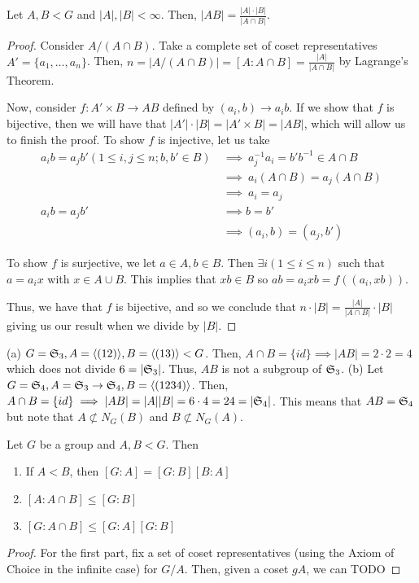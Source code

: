 \documentclass[11pt,leqno,oneside]{amsart}
\newcommand{\subgroup}{\mathrel{<}}
\begin{document}
    \begin{lem}
        Let $A,B \subgroup G$ and $|A|, |B| < \infty$. Then, $|AB| = \frac{|A| \cdot |B|}{|A \cap B|}$.
    \end{lem}
    \begin{proof}
        Consider $A/(A \cap B)$. Take a complete set of coset representatives $A' = \{a_1, \ldots, a_n\}$. Then, $n = |A/(A \cap B)| = [A : A \cap B] = \frac{|A|}{|A \cap B|}$ by Lagrange's Theorem.

        Now, consider $f: A' \times B \to AB$ defined by $(a_i,b) \to a_ib$. If
        we show that $f$ is bijective, then we will have that $|A'| \cdot |B| =
        |A' \times B| = |AB|$, which will allow us to finish the proof.
        To show $f$ is injective, let us take \begin{align*}
            a_ib = a_jb' (1 \leq i,j \leq n; b,b' \in B) & \ \implies \ a_j^{-1} a_i = b'b^{-1} \in A\cap B\\
            \ & \ \implies \ a_i(A \cap B) = a_j(A \cap B) \\
            \ & \ \implies \ a_i = a_j \\
            a_ib = a_jb' & \ \implies b = b' \\
            \ & \ \implies (a_i, b) = (a_j, b')
        \end{align*}

        To show $f$ is surjective, we let $a \in A, b \in B$. Then $\exists i
        (1 \leq i \leq n)$ such that $a=a_ix$ with $x \in A \cup B$. This
        implies that $xb \in B$ so $ab = a_ixb = f( (a_i,xb) )$.

        Thus, we have that $f$ is bijective, and so we conclude that $n \cdot
        |B| = \frac{|A|}{|A \cap B|} \cdot |B|$ giving us our result when we
        divide by $|B|$.
    \end{proof}
    \begin{example}
        (a) $G = \Sym_3, A = \langle (12) \rangle, B = \langle (13) \rangle
        \subgroup G$. Then, $A \cap B = \{ id \} \implies |AB| = 2 \cdot 2 = 4$
        which does not divide $6 = |\mathfrak{S}_3|$. Thus, $AB$ is not a subgroup of
        $\mathfrak{S}_3$.
        (b) Let $G=\mathfrak{S}_4, A = \mathfrak{S}_3 \to \mathfrak{S}_4, B = \langle (1234) \rangle$. Then, $A \cap B = \{id\} \implies |AB| = |A||B| = 6 \cdot 4 = 24 = |\mathfrak{S}_4|$. This means that $AB = \mathfrak{S}_4$ but note that $A \not\subset N_G(B)$ and $B \not\subset N_G(A)$.
    \end{example}
    \begin{lem}
        Let $G$ be a group and $A,B \subgroup G$. Then
        \begin{enumerate}
            \item If $A \subgroup B$, then $[G:A] = [G:B][B:A]$
            \item $[A: A \cap B] \leq [G:B]$
            \item $[G: A \cap B] \leq [G:A][G:B]$
        \end{enumerate}
    \end{lem}
    \begin{proof}
       For the first part, fix a set of coset representatives (using the Axiom of Choice in the infinite case) for $G/A$. Then, given a coset $gA$, we can TODO
\end{proof}
\end{document}

